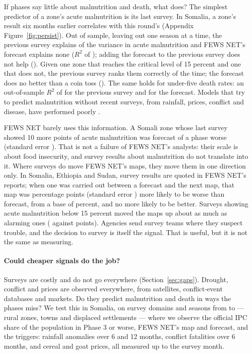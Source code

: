 \documentclass[11pt]{article}
\begin{document}
If phases say little about malnutrition and death, what does? The simplest predictor of a zone's acute malnutrition is its last survey. In Somalia, a zone's result six months earlier correlates \fsCorrLag{} with this round's (Appendix Figure~\ref{fig:persist}). Out of sample, leaving out one season at a time, the previous survey explains \fsRtwoLag{} of the variance in acute malnutrition and FEWS NET's forecast explains none ($R^2$ of \fsRtwoFc{}); adding the forecast to the previous survey does not help (\fsRtwoBoth{}). Given one zone that reaches the critical level of 15 percent and one that does not, the previous survey ranks them correctly \fsAucLag{} of the time; the forecast does no better than a coin toss (\fsAucFc{}). The same holds for under-five death rates: an out-of-sample $R^2$ of \fsMortLag{} for the previous survey and \fsMortFc{} for the forecast. Models that try to predict malnutrition without recent surveys, from rainfall, prices, conflict and disease, have performed poorly \citep{checchi2022malnut}.

FEWS NET barely uses this information. A Somali zone whose last survey showed 10 more points of acute malnutrition was forecast \fsFcOnLag{} of a phase worse (standard error \fsFcOnLagSe{}). That is not a failure of FEWS NET's analysts: their scale is about food insecurity, and survey results about malnutrition do not translate into it. Where surveys do move FEWS NET's maps, they move them in one direction only. In Somalia, Ethiopia and Sudan, \svTotal{} survey results are quoted in FEWS NET's reports; when one was carried out between a forecast and the next map, that map was \nsUp{} percentage points (standard error \nsUpSe{}) more likely to be worse than forecast, from a base of \nsUpBase{} percent, and no more likely to be better. Surveys showing acute malnutrition below 15 percent moved the maps up about as much as alarming ones (\nsOkUp{} against \nsCritUp{} points). Agencies send survey teams where they suspect trouble, and the decision to survey is itself the signal. That is useful, but it is not the same as measuring.

\paragraph{Could cheaper signals do the job?} Surveys are costly and do not go everywhere (Section~\ref{sec:gaps}). Drought, conflict and prices are observed everywhere, from satellites, conflict-event databases and markets. Do they predict malnutrition and death in ways the phases miss? We test this in Somalia, on \trN{} survey domains and seasons from \trYearZero{} to \trYearOne{} --- rural zones, towns and displaced settlements --- where we observe the official IPC share of the population in Phase 3 or worse, FEWS NET's map and forecast, and the triggers: rainfall anomalies over 6 and 12 months, conflict fatalities over 6 months, and cereal and goat prices, all measured up to the survey month.
\end{document}
